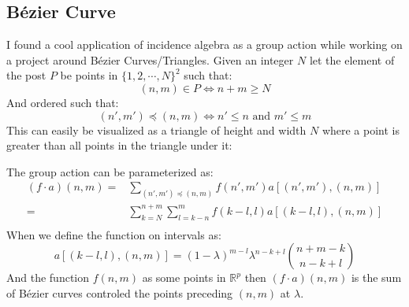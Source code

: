 \subsection{Bézier Curve}
I found a cool application of incidence algebra as a group action while working on a project around Bézier Curves/Triangles.
Given an integer $N$ let the element of the post $P$ be points in $\{1,2,\cdots,N\}^2$ such that:
\[(n,m)\in P \Leftrightarrow n+m\geq N\]
And ordered such that:
\[(n',m') \preceq (n,m) \Leftrightarrow n'\leq n\text{ and }m'\leq m\]
This can easily be visualized as a triangle of height and width $N$ where a point is greater than all points in the triangle under it:
\begin{center}
\end{center}
The group action can be parameterized as:
\[\begin{aligned}
	(f\cdot a)(n,m) =& \sum_{(n',m')\preceq (n,m)}f(n',m')a[(n',m'),(n,m)]\\
	=& \sum_{k=N}^{n+m}\sum_{l=k-n}^{m}f(k-l,l)a[(k-l,l),(n,m)]\\
\end{aligned}\]
When we define the function on intervals as:
\[a[(k-l,l),(n,m)] = (1-\lambda)^{m-l}\lambda^{n-k+l}\binom{n+m-k}{n-k+l}\]
And the function $f(n,m)$ as some points in $\mathbb{R}^p$ then $(f\cdot a)(n,m)$ is the sum of Bézier curves controled the points preceding $(n,m)$ at $\lambda$.

